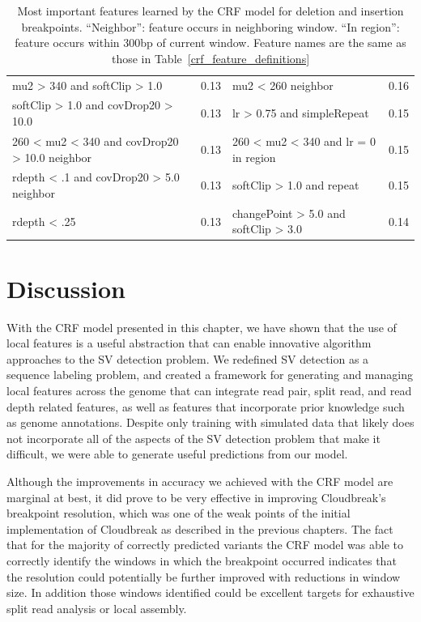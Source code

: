 \begin{table}
\begin{centering}
{\begin{tabular}{|lr|lr|}
mu2 > 340 and softClip > 1.0 & 0.13 & mu2 < 260 neighbor & 0.16 \\
softClip > 1.0 and covDrop20 > 10.0 & 0.13 & lr > 0.75 and simpleRepeat & 0.15 \\
260 < mu2 < 340 and covDrop20 > 10.0 neighbor & 0.13 & 260 < mu2 < 340 and lr = 0 in region & 0.15 \\
rdepth < .1 and covDrop20 > 5.0 neighbor & 0.13 & softClip > 1.0 and repeat & 0.15 \\
rdepth < .25 & 0.13 & changePoint > 5.0 and softClip > 3.0 & 0.14 \\
\hline
\end{tabular}
}
\caption{Most important features learned by the CRF model for deletion and insertion breakpoints. ``Neighbor'': feature occurs in neighboring window. ``In region'': feature occurs within 300bp of current window. Feature names are the same as those in Table~\ref{crf_feature_definitions}}
\end{centering}
\label{crf_feature_selections}
\end{table}

\section{Discussion}

With the CRF model presented in this chapter, we have shown that the use of local features is a useful abstraction that can enable innovative algorithm approaches to the SV detection problem. We redefined SV detection as a sequence labeling problem, and created a framework for generating and managing local features across the genome that can integrate read pair, split read, and read depth related features, as well as features that incorporate prior knowledge such as genome annotations. Despite only training with simulated data that likely does not incorporate all of the aspects of the SV detection problem that make it difficult, we were able to generate useful predictions from our model.

Although the improvements in accuracy we achieved with the CRF model are marginal at best, it did prove to be very effective in improving Cloudbreak's breakpoint resolution, which was one of the weak points of the initial implementation of Cloudbreak as described in the previous chapters. The fact that for the majority of correctly predicted variants the CRF model was able to correctly identify the windows in which the breakpoint occurred indicates that the resolution could potentially be further improved with reductions in window size. In addition those windows identified could be excellent targets for exhaustive split read analysis or local assembly.

